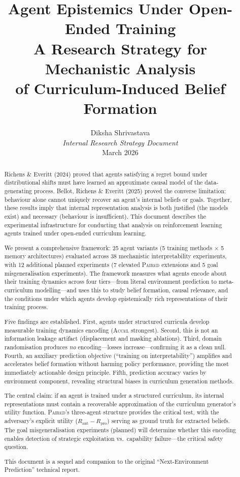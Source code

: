 \documentclass[11pt,a4paper]{article}
\title{
    \textbf{Agent Epistemics Under Open-Ended Training} \\[0.5em]
    \Large A Research Strategy for Mechanistic Analysis \\
    of Curriculum-Induced Belief Formation
}
\author{
    Diksha Shrivastava \\
    \textit{Internal Research Strategy Document} \\
    March 2026
}
\date{}
\theoremstyle{remark}
\newcommand{\paired}{\textsc{Paired}}
\newcommand{\accel}{\textsc{Accel}}
\begin{document}
\maketitle

\begin{abstract}
Richens \& Everitt (2024) proved that agents satisfying a regret bound under distributional shifts must have learned an approximate causal model of the data-generating process. Bellot, Richens \& Everitt (2025) proved the converse limitation: behaviour alone cannot uniquely recover an agent's internal beliefs or goals. Together, these results imply that internal representation analysis is both justified (the models exist) and necessary (behaviour is insufficient). This document describes the experimental infrastructure for conducting that analysis on reinforcement learning agents trained under open-ended curriculum learning.

We present a comprehensive framework: 25 agent variants (5 training methods $\times$ 5 memory architectures) evaluated across 38 mechanistic interpretability experiments, with 12 additional planned experiments (7 elevated \paired{} extensions and 5 goal misgeneralisation experiments). The framework measures what agents encode about their training dynamics across four tiers---from literal environment prediction to meta-curriculum modelling---and uses this to study belief formation, causal relevance, and the conditions under which agents develop epistemically rich representations of their training process.

Five findings are established. First, agents under structured curricula develop measurable training dynamics encoding (\accel{} strongest). Second, this is not an information leakage artifact (displacement and masking ablations). Third, domain randomisation produces \textit{no} encoding---losses increase---confirming it as a clean null. Fourth, an auxiliary prediction objective (``training on interpretability'') amplifies and accelerates belief formation without harming policy performance, providing the most immediately actionable design principle. Fifth, prediction accuracy varies by environment component, revealing structural biases in curriculum generation methods.

The central claim: if an agent is trained under a structured curriculum, its internal representations must contain a recoverable approximation of the curriculum generator's utility function. \paired{}'s three-agent structure provides the critical test, with the adversary's explicit utility ($R_{\text{ant}} - R_{\text{pro}}$) serving as ground truth for extracted beliefs. The goal misgeneralisation experiments (planned) will determine whether this encoding enables detection of strategic exploitation vs.\ capability failure---the critical safety question.

This document is a sequel and companion to the original ``Next-Environment Prediction'' technical report.
\end{abstract}
\end{document}

